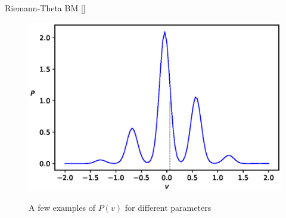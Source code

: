 \documentclass[10pt]{beamer}
\begin{document}
\begin{frame}{Riemann-Theta BM \hfill \small [\cite{2020}]}
\begin{figure}
\begin{center}
          \includegraphics[scale=0.25]{figures/PvPhaseII-3} 
          \label{PvPlots}
        
        \end{center}
        \caption{ A few examples of $P(v)$ for different parameters}
        \end{figure}
\end{frame}


\end{document}
